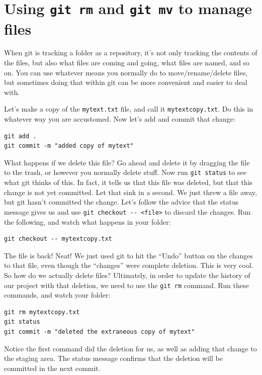 \documentclass[11pt]{article}
\begin{document}
\section{Using \texttt{git rm} and \texttt{git mv} to manage files}
\label{sec-7}

When git is tracking a folder as a repository, it's not only tracking the contents of the files, but also what files are coming and going, what files are named, and so on. You can use whatever means you normally do to move/rename/delete files, but sometimes doing that within git can be more convenient and easier to deal with.

Let's make a copy of the \texttt{mytext.txt} file, and call it \texttt{mytextcopy.txt}.  Do this in whatever way you are accustomed.  Now let's add and commit that change:


\begin{verbatim}
git add .
git commit -m "added copy of mytext"
\end{verbatim}

What happens if we delete this file?  Go ahead and delete it by dragging the file to the trash, or however you normally delete stuff.  Now run \texttt{git status} to see what git thinks of this.  In fact, it tells us that this file was deleted, but that this change is not yet committed.  Let that sink in a second.  We just threw a file away, but git hasn't committed the change.  Let's follow the advice that the status message gives us and use \texttt{git checkout -{}- <file>} to discard the changes.  Run the following, and watch what happens in your folder:


\begin{verbatim}
git checkout -- mytextcopy.txt
\end{verbatim}

The file is back! Neat! We just used git to hit the ``Undo'' button on the changes to that file, even though the ``changes'' were complete deletion. This is very cool. So how do we actually delete files?  Ultimately, in order to update the history of our project with that deletion, we need to use the \texttt{git rm} command. Run these commands, and watch your folder:


\begin{verbatim}
git rm mytextcopy.txt
git status
git commit -m "deleted the extraneous copy of mytext"
\end{verbatim}

Notice the first command did the deletion for us, as well as adding that change to the staging area. The status message confirms that the deletion will be committed in the next commit.
\end{document}
